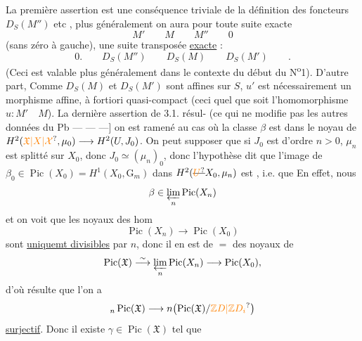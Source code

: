 La première assertion est une conséquence triviale de la définition des foncteurs $D_S(M'')$ etc , plus généralement\unsure{,} on aura pour toute suite exacte
\[
 M'\qquad M\qquad M''\qquad 0
\]
(sans zéro à gauche), une suite transposée \uline{exacte} :
\[
 0.\qquad D_S(M'')\qquad D_S(M)\qquad D_S(M')\qquad .
\]
(Ceci est valable plus généralement dans le contexte du début du N\textsuperscript{o}1).
D'autre part, Comme $D_S(M)$ et $D_S(M')$ sont affines sur $S$, $u'$ est nécessairement un morphisme affine, à fortiori quasi-compact (ceci quel que soit l'homomorphisme $u:M'\quad M$). La dernière assertion de 3.1. résul-
(ce qui ne modifie pas les autres données
du Pb \enspace--- --- ---] on est ramené au
cas où la classe $\beta$ est dans le
noyau de $H^2(\unsure{\mathfrak X|X|\mathcal X},\mu_0)\longrightarrow H^2(U,J_0)$. On peut
supposer  que si $J_0$ est d'ordre $n>0$,
$\mu_n$ est splitté sur $X_0$, donc $J_0\simeq(\mu_n)_0$, donc
l'hypothèse dit que l'image de \deleted{\unsure{$\beta$}}
$\beta_0\in\operatorname{Pic}(X_0)=H^1(X_0,\mathrm G_m)$ dans
$H^2(\deleted{\unsure{U}}X_0,\mu_n)$ est
, i.e. que 
 En effet, nous 
\[
\beta\in\varprojlim_n\operatorname{Pic}(X_n)
\]
et on voit que les noyaux des hom
\[
\operatorname{Pic}(X_n)\longrightarrow\operatorname{Pic}(X_0)
\]
sont  \uline{uniquemt divisibles} par $n$, donc
il en est de $=$ des noyaux de
\[
\operatorname{Pic}(\mathfrak X)\overset{\sim}{\longrightarrow}
\varprojlim_n\operatorname{Pic}(X_n)\longrightarrow\operatorname{Pic}(X_0),
\]
d'où résulte que l'on a
\[
{}_n\operatorname{Pic}(\mathfrak X)\longrightarrow
n\bigl(\operatorname{Pic}(\mathfrak X)/\unsure{\mathbb Z D|{\mathbb Z}D_i}\bigr)
\]
\uline{surjectif}. Donc il existe $\gamma\in\operatorname{Pic}(\mathfrak X)$ tel que
\inserted{$\beta\in\operatorname{Pic}(\mathfrak X)$ défini par $X_0$ de $\mathfrak X$]}
